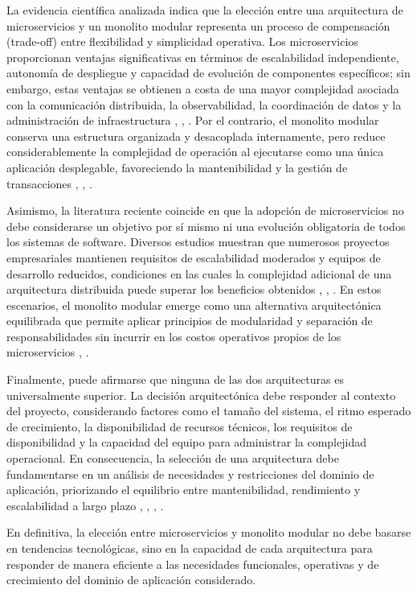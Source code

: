 \documentclass[10pt,conference]{IEEEtran}
\begin{document}
La evidencia científica analizada indica que la elección entre una arquitectura de microservicios y un monolito modular representa un proceso de compensación (trade-off) entre flexibilidad y simplicidad operativa. Los microservicios proporcionan ventajas significativas en términos de escalabilidad independiente, autonomía de despliegue y capacidad de evolución de componentes específicos; sin embargo, estas ventajas se obtienen a costa de una mayor complejidad asociada con la comunicación distribuida, la observabilidad, la coordinación de datos y la administración de infraestructura \cite{ref9}, \cite{ref10}, \cite{ref13}. Por el contrario, el monolito modular conserva una estructura organizada y desacoplada internamente, pero reduce considerablemente la complejidad de operación al ejecutarse como una única aplicación desplegable, favoreciendo la mantenibilidad y la gestión de transacciones \cite{ref18}, \cite{ref21}, \cite{ref19}.

Asimismo, la literatura reciente coincide en que la adopción de microservicios no debe considerarse un objetivo por sí mismo ni una evolución obligatoria de todos los sistemas de software. Diversos estudios muestran que numerosos proyectos empresariales mantienen requisitos de escalabilidad moderados y equipos de desarrollo reducidos, condiciones en las cuales la complejidad adicional de una arquitectura distribuida puede superar los beneficios obtenidos \cite{ref20}, \cite{ref10}, \cite{ref19}. En estos escenarios, el monolito modular emerge como una alternativa arquitectónica equilibrada que permite aplicar principios de modularidad y separación de responsabilidades sin incurrir en los costos operativos propios de los microservicios \cite{ref18}, \cite{ref21}.

Finalmente, puede afirmarse que ninguna de las dos arquitecturas es universalmente superior. La decisión arquitectónica debe responder al contexto del proyecto, considerando factores como el tamaño del sistema, el ritmo esperado de crecimiento, la disponibilidad de recursos técnicos, los requisitos de disponibilidad y la capacidad del equipo para administrar la complejidad operacional. En consecuencia, la selección de una arquitectura debe fundamentarse en un análisis de necesidades y restricciones del dominio de aplicación, priorizando el equilibrio entre mantenibilidad, rendimiento y escalabilidad a largo plazo \cite{ref9}, \cite{ref18}, \cite{ref20}, \cite{ref19}.

En definitiva, la elección entre microservicios y monolito modular no debe basarse en tendencias tecnológicas, sino en la capacidad de cada arquitectura para responder de manera eficiente a las necesidades funcionales, operativas y de crecimiento del dominio de aplicación considerado.
\end{document}
